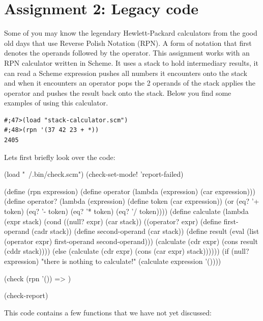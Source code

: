 \documentclass[12pt,a4paper,english,twoside]{article}
\begin{document}
\section{Assignment 2: Legacy code}
Some of you may know the legendary Hewlett-Packard calculators from the good 
old days that use Reverse Polish Notation (RPN). A form of notation that first 
denotes the operands followed by the operator. This assignment works with an
RPN calculator written in Scheme. It uses a stack to hold intermediary 
results, it can read a Scheme expression pushes all numbers it encounters onto 
the stack and when it encounters an operator pops the 2 operands of the stack 
applies the operator and pushes the result back onto the stack. Below you find 
some examples of using this calculator.
\begin{lstlisting}
#;47>(load "stack-calculator.scm")
#;48>(rpn '(37 42 23 + *))
2405
\end{lstlisting}
\vfill
\pagebreak
Lets first briefly look over the code:
\begin{schemecode}
(load "~/.bin/check.scm")
(check-set-mode! 'report-failed)

(define (rpn expression)
  (define operator
    (lambda (expression) 
      (car expression)))
  (define operator? 
    (lambda (expression)
      (define token (car expression))
      (or (eq? '+ token)
          (eq? '- token)
          (eq? '* token)
          (eq? '/ token))))
  (define calculate (lambda (expr stack)
      (cond ((null? expr) (car stack))
            ((operator? expr)
              (define first-operand (cadr stack))
              (define second-operand (car stack))
              (define result (eval (list 
                                     (operator expr) 
                                     first-operand 
                                     second-operand)))
              (calculate (cdr expr) (cons result (cddr stack))))
            (else (calculate (cdr expr) (cons (car expr) stack))))))
  (if (null? expression)
    "there is nothing to calculate!"
    (calculate expression '())))

(check (rpn '()) => )

(check-report)
\end{schemecode}
This code contains a few functions that we have not yet discussed:
\end{document}

